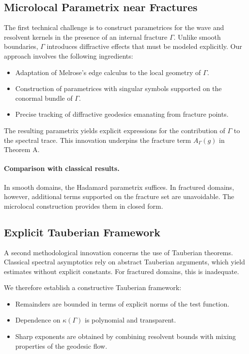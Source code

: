 \subsection{Microlocal Parametrix near Fractures}

The first technical challenge is to construct parametrices for the wave and
resolvent kernels in the presence of an internal fracture $\Gamma$. Unlike
smooth boundaries, $\Gamma$ introduces diffractive effects that must be modeled
explicitly. Our approach involves the following ingredients:

\begin{itemize}
  \item Adaptation of Melrose's edge calculus to the local geometry of $\Gamma$.
  \item Construction of parametrices with singular symbols supported on the
  conormal bundle of $\Gamma$.
  \item Precise tracking of diffractive geodesics emanating from fracture points.
\end{itemize}

The resulting parametrix yields explicit expressions for the contribution of
$\Gamma$ to the spectral trace. This innovation underpins the fracture term
$A_\Gamma(g)$ in Theorem A.

\paragraph{Comparison with classical results.}
In smooth domains, the Hadamard parametrix suffices. In fractured domains,
however, additional terms supported on the fracture set are unavoidable. The
microlocal construction provides them in closed form.

\subsection{Explicit Tauberian Framework}

A second methodological innovation concerns the use of Tauberian theorems.
Classical spectral asymptotics rely on abstract Tauberian arguments, which yield
estimates without explicit constants. For fractured domains, this is inadequate.

We therefore establish a constructive Tauberian framework:

\begin{itemize}
  \item Remainders are bounded in terms of explicit norms of the test function.
  \item Dependence on $\kappa(\Gamma)$ is polynomial and transparent.
  \item Sharp exponents are obtained by combining resolvent bounds with mixing
  properties of the geodesic flow.
\end{itemize}

